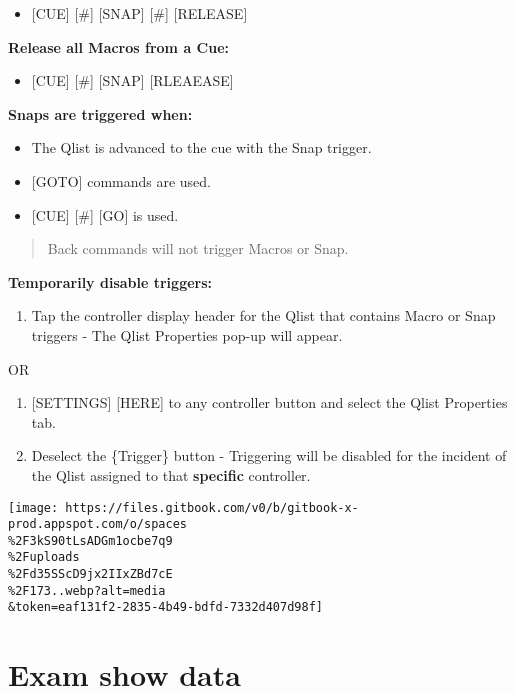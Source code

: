\documentclass[
]{article}
\providecommand{\tightlist}{%
  \setlength{\itemsep}{0pt}\setlength{\parskip}{0pt}}
\begin{document}
\begin{itemize}
\tightlist
\item
  {[}CUE{]} {[}\#{]} {[}SNAP{]} {[}\#{]} {[}RELEASE{]}
\end{itemize}

\textbf{Release all Macros from a Cue:}

\begin{itemize}
\tightlist
\item
  {[}CUE{]} {[}\#{]} {[}SNAP{]} {[}RLEAEASE{]}
\end{itemize}

\textbf{Snaps are triggered when:}

\begin{itemize}
\item
  The Qlist is advanced to the cue with the Snap trigger.
\item
  {[}GOTO{]} commands are used.
\item
  {[}CUE{]} {[}\#{]} {[}GO{]} is used.
\end{itemize}

\begin{quote}
Back commands will not trigger Macros or Snap.
\end{quote}

\textbf{Temporarily disable triggers:}

\begin{enumerate}
\def\labelenumi{\arabic{enumi}.}
\tightlist
\item
  Tap the controller display header for the Qlist that contains Macro or Snap triggers - The Qlist Properties pop-up will appear.
\end{enumerate}

OR

\begin{enumerate}
\def\labelenumi{\arabic{enumi}.}
\item
  {[}SETTINGS{]} {[}HERE{]} to any controller button and select the Qlist Properties tab.
\item
  Deselect the \{Trigger\} button - Triggering will be disabled for the incident of the Qlist assigned to that \textbf{specific} controller.
\end{enumerate}

\texttt{[image: https://files.gitbook.com/v0/b/gitbook-x-prod.appspot.com/o/spaces\\\%2F3kS90tLsADGm1ocbe7q9\\\%2Fuploads\\\%2Fd35SScD9jx2IIxZBd7cE\\\%2F173..webp?alt=media\\\&token=eaf131f2-2835-4b49-bdfd-7332d407d98f]}

\hypertarget{exam-show-data}{%
\section{Exam show data}\label{exam-show-data}}
\end{document}
